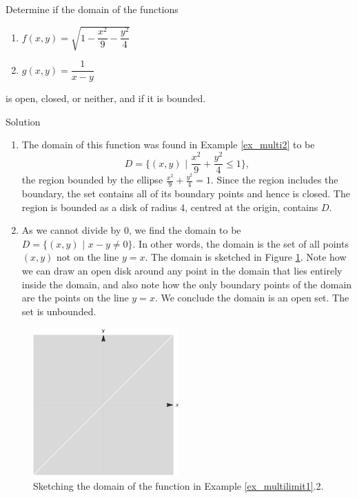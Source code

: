 \ifanalysis\pagebreak\fi
\begin{example}\label{ex_multilimit1}
Determine if the domain of the functions 
\begin{multicols}{2}
\begin{enumerate}
\item $f(x,y)=\sqrt{1-\dfrac{x^2}9-\dfrac{y^2}4}$
\item  $g(x,y) = \dfrac{1}{x-y}$
\end{enumerate}
\end{multicols}
 is open, closed, or neither, and if it is bounded.

Solution 

\begin{enumerate}
\item The domain of this function was found in Example \ref{ex_multi2} to be 
$$D = \bigg\{(x,y)\,\, \bigg| \,\, \frac{x^2}9+\frac{y^2}4\leq 1\bigg\},$$ the region bounded by the ellipse $\frac{x^2}{9}+\frac{y^2}{4}=1$. Since the region includes the boundary, the set contains all of its boundary points and hence is closed. The region is bounded as a disk of radius 4, centred at the origin, contains $D$.
\item As we cannot divide by 0, we find the domain to be $D = \big\{(x,y) \,\, \big|\,\, x-y\neq 0\big\}$. In other words, the domain is the set of all points $(x,y)$ not on the line $y=x$. 
The domain is sketched in Figure \ref{fig_multi_var_6}. Note how we can draw an open disk around any point in the domain that lies entirely inside the domain, and also note how the only boundary points of the domain are the points on the line $y=x$. We conclude the domain is an open set. The set is unbounded.
\end{enumerate}
\begin{figure}[H]
	\begin{center}
			\includegraphics[width=0.5\textwidth]{fig_multi_var_6}
	\caption{Sketching the domain of the function in Example \ref{ex_multilimit1}.2.}
	\label{fig_multi_var_6}
	\end{center}
\end{figure}
\end{example}

